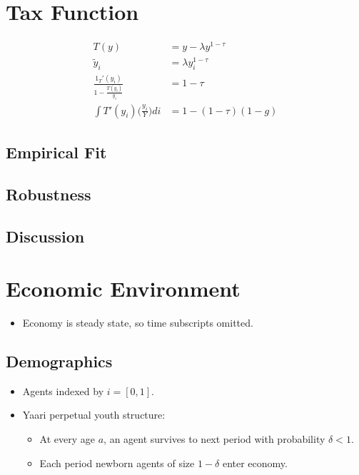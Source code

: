 \documentclass{article}
\begin{document}
\section{Tax Function}

\begin{align}
T(y) &= y - \lambda y^{1 - \tau} \label{tax_function} \\
\tilde y_i &= \lambda y_i^{1-\tau} \\
\frac{1 _ T'(y_i)}{1 - \frac{T(y_i)}{y_i}} &= 1 - \tau\\
\int T'(y_i) \Bigg( \frac{y_i}{Y} \Bigg) di &= 1 - (1-\tau)(1-g)
\end{align}

\subsection{Empirical Fit}

\subsection{Robustness}

\subsection{Discussion}

\section{Economic Environment}

\begin{itemize}

\item Economy is steady state, so time subscripts omitted.

\end{itemize}

\subsection{Demographics}

\begin{itemize}

\item Agents indexed by $i = [0,1]$.

\item Yaari perpetual youth structure: 

\begin{itemize}

\item At every age $a$, an agent survives to next period with probability $\delta < 1$.

\item Each period newborn agents of size $1-\delta$ enter economy.

\end{itemize}

\end{itemize}
\end{document}
